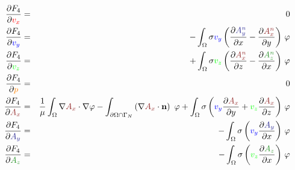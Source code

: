 \documentclass[smallextended]{svjour3}       %
\begin{document}
		\begin{eqnarray}
		\frac{\partial F_4}{\partial \textcolor{red}{v_x}} & = & 0 \\
		\frac{\partial F_4}{\partial \textcolor{blu}{v_y}} & = &
		-\int_{\Omega} \sigma \textcolor{blu}{v_y} \left(\frac{\partial \textcolor{darkblu}{A_y^n}}{\partial x} - \frac{\partial \textcolor{darkred}{A_x^n}}{\partial y}\right)\,\varphi  \\
		\frac{\partial F_4}{\partial \textcolor{gre}{v_z}} & = &
		+\int_{\Omega} \sigma \textcolor{gre}{v_z} \left(\frac{\partial \textcolor{darkred}{A_x^n}}{\partial z} - \frac{\partial \textcolor{darkgre}{A_z^n}}{\partial x}\right)\,\varphi\\
		\frac{\partial F_4}{\partial \textcolor{orange}{p}} & = & 0 \\
		\frac{\partial F_4}{\partial \textcolor{darkred}{A_x}} & = & 
		\frac{1}{\mu}\int_{\Omega}\nabla \textcolor{darkred}{A_x} \cdot \nabla \varphi - \int_{\partial \Omega \cap \Gamma_{N}} \left(\nabla \textcolor{darkred}{A_x}\cdot \mathbf{n}\right)\ \varphi 
			 + \int_{\Omega} \sigma \left(\textcolor{blu}{v_y} \frac{\partial \textcolor{darkred}{A_x}}{\partial y} + \textcolor{gre}{v_z} \frac{\partial \textcolor{darkred}{A_x}}{\partial z}\right)\,\varphi\\
		\frac{\partial F_4}{\partial \textcolor{darkblu}{A_y}} & = & 
		-  \int_{\Omega} \sigma \left(\textcolor{blu}{v_y} \frac{\partial \textcolor{darkblu}{A_y}}{\partial x}\right)\,\varphi\\
		\frac{\partial F_4}{\partial \textcolor{darkgre}{A_z}} & = & 
		-  \int_{\Omega} \sigma \left(\textcolor{gre}{v_z} \frac{\partial \textcolor{darkgre}{A_z}}{\partial x}\right)\,\varphi
		\end{eqnarray}
		
\end{document}
